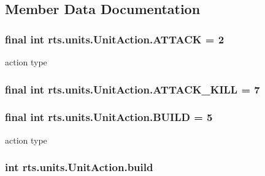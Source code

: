 \subsection{Member Data Documentation}
\hypertarget{classrts_1_1units_1_1_unit_action_ac7dc8c479850fc28ba6c58d217b82936}{
\subsubsection[{ATTACK}]{\setlength{\rightskip}{0pt plus 5cm}final int {\bf rts.units.UnitAction.ATTACK} = 2}}
\label{classrts_1_1units_1_1_unit_action_ac7dc8c479850fc28ba6c58d217b82936}
action type \hypertarget{classrts_1_1units_1_1_unit_action_ab0b5666fd15fa8981e2abb48b8c277e9}{
\subsubsection[{ATTACK\_\-KILL}]{\setlength{\rightskip}{0pt plus 5cm}final int {\bf rts.units.UnitAction.ATTACK\_\-KILL} = 7}}
\label{classrts_1_1units_1_1_unit_action_ab0b5666fd15fa8981e2abb48b8c277e9}
\hypertarget{classrts_1_1units_1_1_unit_action_a69b96542b4c5f0d3fb7676183d62f0bd}{
\subsubsection[{BUILD}]{\setlength{\rightskip}{0pt plus 5cm}final int {\bf rts.units.UnitAction.BUILD} = 5}}
\label{classrts_1_1units_1_1_unit_action_a69b96542b4c5f0d3fb7676183d62f0bd}
action type \hypertarget{classrts_1_1units_1_1_unit_action_a9580a2a6c1e668979f0ea0059e55988c}{
\subsubsection[{build}]{\setlength{\rightskip}{0pt plus 5cm}int {\bf rts.units.UnitAction.build}}}
